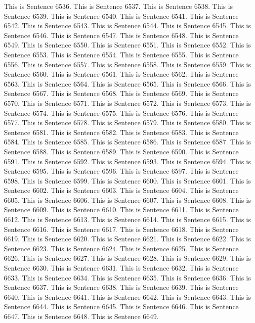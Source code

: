 \documentclass{article}
\begin{document}
This is Sentence 6536.
This is Sentence 6537.
This is Sentence 6538.
This is Sentence 6539.
This is Sentence 6540.
This is Sentence 6541.
This is Sentence 6542.
This is Sentence 6543.
This is Sentence 6544.
This is Sentence 6545.
This is Sentence 6546.
This is Sentence 6547.
This is Sentence 6548.
This is Sentence 6549.
This is Sentence 6550.
This is Sentence 6551.
This is Sentence 6552.
This is Sentence 6553.
This is Sentence 6554.
This is Sentence 6555.
This is Sentence 6556.
This is Sentence 6557.
This is Sentence 6558.
This is Sentence 6559.
This is Sentence 6560.
This is Sentence 6561.
This is Sentence 6562.
This is Sentence 6563.
This is Sentence 6564.
This is Sentence 6565.
This is Sentence 6566.
This is Sentence 6567.
This is Sentence 6568.
This is Sentence 6569.
This is Sentence 6570.
This is Sentence 6571.
This is Sentence 6572.
This is Sentence 6573.
This is Sentence 6574.
This is Sentence 6575.
This is Sentence 6576.
This is Sentence 6577.
This is Sentence 6578.
This is Sentence 6579.
This is Sentence 6580.
This is Sentence 6581.
This is Sentence 6582.
This is Sentence 6583.
This is Sentence 6584.
This is Sentence 6585.
This is Sentence 6586.
This is Sentence 6587.
This is Sentence 6588.
This is Sentence 6589.
This is Sentence 6590.
This is Sentence 6591.
This is Sentence 6592.
This is Sentence 6593.
This is Sentence 6594.
This is Sentence 6595.
This is Sentence 6596.
This is Sentence 6597.
This is Sentence 6598.
This is Sentence 6599.
This is Sentence 6600.
This is Sentence 6601.
This is Sentence 6602.
This is Sentence 6603.
This is Sentence 6604.
This is Sentence 6605.
This is Sentence 6606.
This is Sentence 6607.
This is Sentence 6608.
This is Sentence 6609.
This is Sentence 6610.
This is Sentence 6611.
This is Sentence 6612.
This is Sentence 6613.
This is Sentence 6614.
This is Sentence 6615.
This is Sentence 6616.
This is Sentence 6617.
This is Sentence 6618.
This is Sentence 6619.
This is Sentence 6620.
This is Sentence 6621.
This is Sentence 6622.
This is Sentence 6623.
This is Sentence 6624.
This is Sentence 6625.
This is Sentence 6626.
This is Sentence 6627.
This is Sentence 6628.
This is Sentence 6629.
This is Sentence 6630.
This is Sentence 6631.
This is Sentence 6632.
This is Sentence 6633.
This is Sentence 6634.
This is Sentence 6635.
This is Sentence 6636.
This is Sentence 6637.
This is Sentence 6638.
This is Sentence 6639.
This is Sentence 6640.
This is Sentence 6641.
This is Sentence 6642.
This is Sentence 6643.
This is Sentence 6644.
This is Sentence 6645.
This is Sentence 6646.
This is Sentence 6647.
This is Sentence 6648.
This is Sentence 6649.
\end{document}
